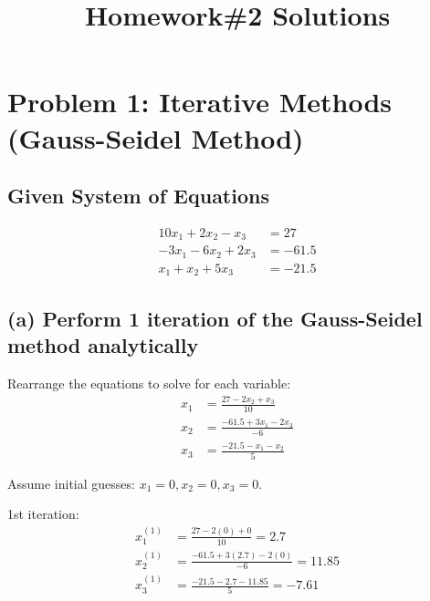 \documentclass{article}
\title{Homework\#2 Solutions}
\author{}
\date{}
\begin{document}
\maketitle

\section*{Problem 1: Iterative Methods (Gauss-Seidel Method)}

\subsection*{Given System of Equations}
\begin{align*}
10x_1 + 2x_2 - x_3 &= 27 \\
-3x_1 - 6x_2 + 2x_3 &= -61.5 \\
x_1 + x_2 + 5x_3 &= -21.5
\end{align*}

\subsection*{(a) Perform 1 iteration of the Gauss-Seidel method analytically}

Rearrange the equations to solve for each variable:
\begin{align*}
x_1 &= \frac{27 - 2x_2 + x_3}{10} \\
x_2 &= \frac{-61.5 + 3x_1 - 2x_3}{-6} \\
x_3 &= \frac{-21.5 - x_1 - x_2}{5}
\end{align*}

Assume initial guesses: \( x_1 = 0, x_2 = 0, x_3 = 0 \).

1st iteration:
\begin{align*}
x_1^{(1)} &= \frac{27 - 2(0) + 0}{10} = 2.7 \\
x_2^{(1)} &= \frac{-61.5 + 3(2.7) - 2(0)}{-6} = 11.85 \\
x_3^{(1)} &= \frac{-21.5 - 2.7 - 11.85}{5} = -7.61
\end{align*}


\end{document}
